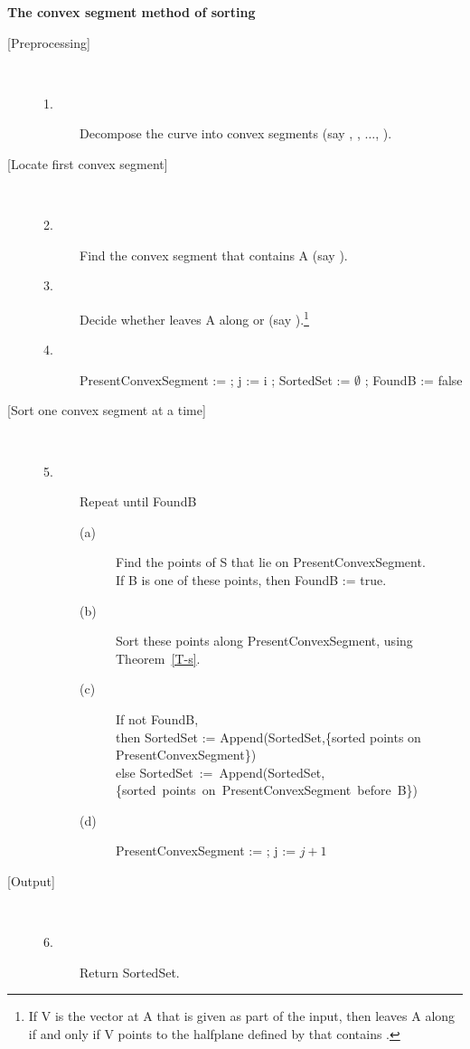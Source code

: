 \begin{center}{\bf The convex segment method of sorting}\end{center}
\begin{description}
\item[{[Preprocessing]}] \ \ \ 
\begin{description}
\item[1.] Decompose the curve into convex segments
	(say , , $\ldots$, 
	).
\end{description}
\clearpage
%
\item[{[Locate first convex segment]}] \ \ \ 
\begin{description}
\item[2.]
	Find the convex segment that contains A (say ).
\item[3.]
	Decide whether  leaves A along \arc{AW_{i-1}} or 
	(say ).\footnote{If V is the vector at A that is given as 
		part of the input, then \arc{AB} leaves A along \arc{AW_{i}} if 
\label{alg-page}
		and only if V points to the halfplane defined by  
		that contains .}
\item[4.]
	PresentConvexSegment :=  ;
	j := i ;
	SortedSet := $\emptyset$ ;
	FoundB := false
\end{description}
%
\item[{[Sort one convex segment at a time]}] \ \ \ 
\begin{description}
\item[5.]
	Repeat until FoundB
\begin{description}
\item[(a)]
	Find the points of S that lie on PresentConvexSegment.\\
	If B is one of these points, then FoundB := true.
\item[(b)]
	Sort these points along PresentConvexSegment, 
	using Theorem~\ref{T-s}.
\item[(c)]
	If not FoundB,\\
	then SortedSet := Append(SortedSet,\{sorted points on PresentConvexSegment\})\\
	else \mbox{SortedSet := Append(SortedSet,\{sorted points on PresentConvexSegment before B\})}
\item[(d)]
	PresentConvexSegment := \arc{W_{j}W_{j+1}} ; j := $j+1$
\end{description}
\end{description}
%
\item[{[Output]}] \ \ \ 
\begin{description}
\item[6.]
	Return SortedSet.
\end{description}
\end{description}

